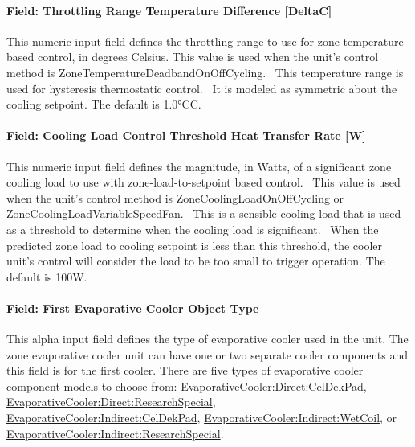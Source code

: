 \paragraph{Field: Throttling Range Temperature Difference {[}DeltaC{]}}\label{field-throttling-range-temperature-difference-deltac}

This numeric input field defines the throttling range to use for zone-temperature based control, in degrees Celsius. This value is used when the unit's control method is ZoneTemperatureDeadbandOnOffCycling.~ This temperature range is used for hysteresis thermostatic control.~ It is modeled as symmetric about the cooling setpoint. The default is 1.0°\si{C}C.

\paragraph{Field: Cooling Load Control Threshold Heat Transfer Rate {[}W{]}}\label{field-cooling-load-control-threshold-heat-transfer-rate-w}

This numeric input field defines the magnitude, in Watts, of a significant zone cooling load to use with zone-load-to-setpoint based control.~ This value is used when the unit's control method is ZoneCoolingLoadOnOffCycling or ZoneCoolingLoadVariableSpeedFan.~ This is a sensible cooling load that is used as a threshold to determine when the cooling load is significant.~ When the predicted zone load to cooling setpoint is less than this threshold, the cooler unit's control will consider the load to be too small to trigger operation. The default is 100W.

\paragraph{Field: First Evaporative Cooler Object Type}\label{field-first-evaporative-cooler-object-type}

This alpha input field defines the type of evaporative cooler used in the unit. The zone evaporative cooler unit can have one or two separate cooler components and this field is for the first cooler. There are five types of evaporative cooler component models to choose from: \hyperref[evaporativecoolerdirectceldekpad]{EvaporativeCooler:Direct:CelDekPad}, \hyperref[evaporativecoolerdirectresearchspecial]{EvaporativeCooler:Direct:ResearchSpecial}, \hyperref[evaporativecoolerindirectceldekpad]{EvaporativeCooler:Indirect:CelDekPad}, \hyperref[evaporativecoolerindirectwetcoil]{EvaporativeCooler:Indirect:WetCoil}, or \hyperref[evaporativecoolerindirectresearchspecial]{EvaporativeCooler:Indirect:ResearchSpecial}.

